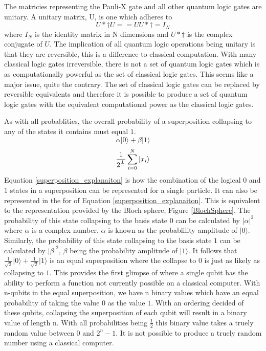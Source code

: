 \documentclass[authoryearcitations]{UoYCSproject}
\begin{document}
The matricies representing the Pauli-X gate and all other quantum logic gates are unitary.
A unitary matrix, U, is one which adheres to
\begin{equation}
U*{\dagger}
U == UU*{\dagger} = I_N
\end{equation}
where $I_N$ is the identity matrix in N dimensions and $U*{\dagger}$ is the complex conjugate of $U$.
The implication of all quantum logic operations being unitary is that they are reversible, this is a difference to classical computation.
With many classical logic gates irreversible, there is not a set of quantum logic gates which is as computationally powerful as the set of classical logic gates.
This seems like a major issue, quite the contrary.
The set of classical logic gates can be replaced by reversible equivalents and therefore it is possible to produce a set of quantum logic gates with the equivalent computational power as the classical logic gates.

As with all probablities, the overall probability of a superposition collapsing to any of the states it contains must equal $1$.
\begin{equation}
\label{superposition_explanaiton}
\alpha\vert0\rangle+\beta\vert1\rangle
\end{equation}
\begin{equation}
\label{superposition_explanaiton_sum}
\frac{1}{2^{\frac{1}{n}}}\sum\limits_{i=0}^N \left\vert{x_i}\right\rangle
\end{equation}
Equation \eqref{superposition_explanaiton} is how the combination of the logical $0$ and $1$ states in a superposition can be represented for a single particle.
It can also be represented in the for of Equation \eqref{superposition_explanaiton}.
This is equivalent to the representation provided by the Bloch sphere, Figure \ref{BlochSphere}.
The probability of this state collapsing to the basis state $0$ can be calculated by $\vert\alpha\vert^2$ where $\alpha$ is a complex number.
$\alpha$ is known as the probablility amplitude of $\vert0\rangle$.
Similarly, the probability of this state collapsing to the basis state $1$ can be calculated by $\vert\beta\vert^2$, $\beta$ being the probability amplitude of $\vert1\rangle$.
It follows that $\frac{1}{\sqrt{2}}\vert0\rangle+\frac{1}{\sqrt{2}}\vert1\rangle$ is an equal superposition where the collapse to 0 is just as likely as collapsing to $1$.
This provides the first glimpse of where a single qubit has the ability to perform a function not currently possible on a classical computer.
With n-qubits in the equal superposition, we have n binary values which have an equal probability of taking the value $0$ as the value $1$.
With an ordering decided of these qubits, collapsing the superposition of each qubit will result in a binary value of length n.
With all probabilities being $\frac{1}{2}$ this binary value takes a truely random value between $0$ and $2^n-1$.
It is not possible to produce a truely random number using a classical computer.
\end{document}
